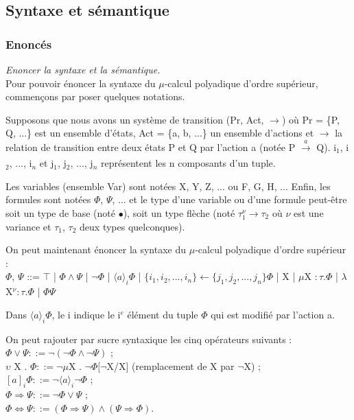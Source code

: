 \documentclass[11pt,a4paper]{article}
\begin{document}
\subsection{Syntaxe et sémantique}

\subsubsection{Enoncés}


\textit{Enoncer la syntaxe et la sémantique.}
\\

Pour pouvoir énoncer la syntaxe du $\mu$-calcul polyadique d'ordre supérieur, commençons par poser quelques notations. 

Supposons que nous avons un système de transition (Pr, Act, $\rightarrow$) où Pr = \{P, Q, ...\} est un ensemble d'états, Act = \{a, b, ...\} un ensemble d'actions et $\rightarrow$ la relation de transition entre deux états P et Q par l'action a (notée P $\xrightarrow[]{a}$ Q). i$_{1}$, i$_{2}$, ..., i$_{n}$ et j$_{1}$, j$_{2}$, ..., j$_{n}$ représentent les n composants d'un tuple. 

Les variables (ensemble Var) sont notées X, Y, Z, ... ou F, G, H, ... Enfin, les formules sont notées $\Phi$, $\Psi$, ... et le type d'une variable ou d'une formule peut-être soit un type de base (noté $\bullet$), soit un type flèche (noté $\tau_1^{\nu} \rightarrow \tau_2$ où $\nu$ est une variance et $\tau_1$, $\tau_2$ deux types quelconques).

On peut maintenant énoncer la syntaxe du $\mu$-calcul polyadique d'ordre supérieur :
\\
$\Phi$, $\Psi$ ::= $\top$ | $\Phi \wedge \Psi$ | $\neg\Phi$ | $\langle a \rangle_i \Phi$ | $\{i_{1}, i_{2}, ..., i_{n}\} \leftarrow \{j_{1}, j_{2}, ..., j_{n}\} \Phi$ | X | $\mu$X $: \tau . \Phi$ | $\lambda$X$^{\nu} : \tau . \Phi$ | $\Phi \Psi$

\begin{rema} Dans $\langle a \rangle_i \Phi$, le i indique le i$^{e}$ élément du tuple $\Phi$ qui est modifié par l'action a. 
\end{rema}

\begin{notat} On peut rajouter par sucre syntaxique les cinq opérateurs suivants : 
\\ 
$\Phi \vee \Psi ::= \neg (\neg \Phi \wedge \neg \Psi)$ ;
\\
$\upsilon$ X . $\Phi ::= \neg \mu$X . $\neg \Phi [\neg$X/X$]$ (remplacement de X par $\neg$X) ; 
\\
$[a]_i \Phi ::= \neg \langle a \rangle_i \neg \Phi$ ;
\\
$\Phi \Rightarrow \Psi ::= \neg \Phi \vee \Psi$ ;
\\
$\Phi \Leftrightarrow \Psi ::= (\Phi \Rightarrow \Psi) \wedge (\Psi \Rightarrow \Phi)$.
\end{notat}
\end{document}

